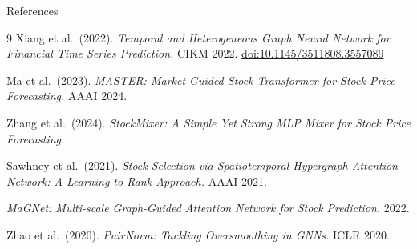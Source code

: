 \documentclass[aspectratio=169, 10pt]{beamer}
\begin{document}
\appendix

\begin{frame}{References}
  \begin{thebibliography}{9}
      Xiang et al.\ (2022).
      \textit{Temporal and Heterogeneous Graph Neural Network for Financial
      Time Series Prediction.} CIKM 2022.
      \href{https://doi.org/10.1145/3511808.3557089}{doi:10.1145/3511808.3557089}

      Ma et al.\ (2023).
      \textit{MASTER: Market-Guided Stock Transformer for Stock Price
      Forecasting.} AAAI 2024.

      Zhang et al.\ (2024).
      \textit{StockMixer: A Simple Yet Strong MLP Mixer for Stock
      Price Forecasting.}

      Sawhney et al.\ (2021).
      \textit{Stock Selection via Spatiotemporal Hypergraph Attention
      Network: A Learning to Rank Approach.} AAAI 2021.

      \textit{MaGNet: Multi-scale Graph-Guided Attention Network for
      Stock Prediction.} 2022.

      Zhao et al.\ (2020).
      \textit{PairNorm: Tackling Oversmoothing in GNNs.} ICLR 2020.
  \end{thebibliography}
\end{frame}
\end{document}
